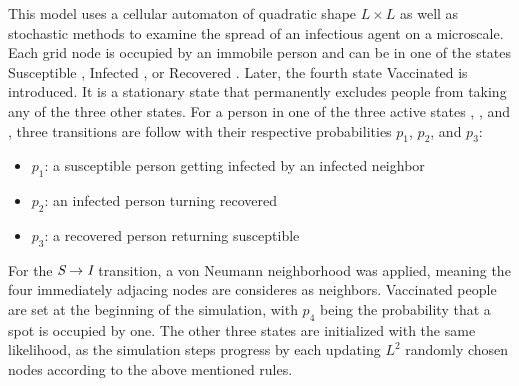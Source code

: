 This model uses a cellular automaton\cite{CellularAutomaton} of quadratic shape $L\times L$ as well as stochastic methods to examine the spread of an infectious agent on a microscale. 
Each grid node is occupied by an immobile person and can be in one of the states Susceptible \susceptible{}, Infected \infected{}, or Recovered \recovered{}. Later, the fourth state Vaccinated \vaccinated{} is introduced. 
It is a stationary state that permanently excludes people from taking any of the three other states. 
For a person in one of the three active states \susceptible{}, \infected{}, and \recovered{}, three transitions are follow with their respective probabilities $p_1$, $p_2$, and $p_3$:
\begin{figure}[H]
    \centering
\end{figure}
\begin{itemize}
    \item $p_1$: a susceptible person getting infected by an infected neighbor
    \item $p_2$: an infected person turning recovered
    \item $p_3$: a recovered person returning susceptible
\end{itemize}
For the $\textit{S}{}\rightarrow\textit{I}{}$ transition, a von Neumann neighborhood was applied, meaning the four immediately adjacing nodes are consideres as neighbors.\cite{CellularAutomaton} 
Vaccinated people \vaccinated{} are set at the beginning of the simulation, with $p_4$ being the probability that a spot is occupied by one. The other three states are initialized with the same likelihood, as the 
simulation steps progress by each updating $L^2$ randomly chosen nodes according to the above mentioned rules.

